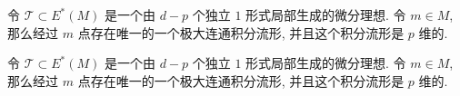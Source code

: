 \begin{example}
    令 $\mathscr{T} \subset E^*(M)$ 是一个由 $d-p$ 个独立 $1$ 形式局部生成的微分理想. 令 $m \in M$, 那么经过 $m$ 点存在唯一的一个极大连通积分流形, 并且这个积分流形是 $p$ 维的.
\end{example}
\begin{fancybox}
    令 $\mathscr{T} \subset E^*(M)$ 是一个由 $d-p$ 个独立 $1$ 形式局部生成的微分理想. 令 $m \in M$, 那么经过 $m$ 点存在唯一的一个极大连通积分流形, 并且这个积分流形是 $p$ 维的.
\end{fancybox}




































































































